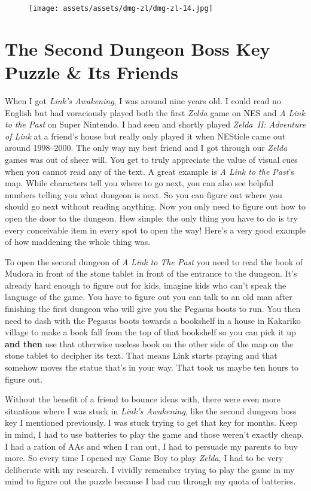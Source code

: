 \documentclass{book}
\begin{document}
\begin{figure}[hbt]
\vskip 10pt
\centering \texttt{[image: assets/assets/dmg-zl/dmg-zl-14.jpg]}
\vskip 6pt
\end{figure}

\FloatBarrier\needspace{10mm}\section*{The Second Dungeon Boss Key Puzzle \& Its Friends}\nopagebreak[4]

When I got \emph{Link’s Awakening}, I was around nine years old. I could read no English but had voraciously played both the first \emph{Zelda} game on NES and \emph{A Link to the Past} on Super Nintendo. I had seen and shortly played \emph{Zelda~II: Adventure of Link} at a friend’s house but really only played it when NESticle came out around 1998–2000. The only way my best friend and I got through our \emph{Zelda} games was out of sheer will. You get to truly appreciate the value of visual cues when you cannot read any of the text. A great example is \emph{A Link to the Past}’s map. While characters tell you where to go next, you can also see helpful numbers telling you what dungeon is next. So you can figure out where you should go next without reading anything. Now you only need to figure out how to open the door to the dungeon. How simple: the only thing you have to do is try every conceivable item in every spot to open the way! Here’s a very good example of how maddening the whole thing was.

To open the second dungeon of \emph{A Link to The Past} you need to read the book of Mudora in front of the stone tablet in front of the entrance to the dungeon. It’s already hard enough to figure out for kids, imagine kids who can’t speak the language of the game. You have to figure out you can talk to an old man after finishing the first dungeon who will give you the Pegasus boots to run. You then need to dash with the Pegasus boots towards a bookshelf in a house in Kakariko village to make a book fall from the top of that bookshelf so you can pick it up \textbf{and then} use that otherwise useless book on the other side of the map on the stone tablet to decipher its text. That means Link starts praying and that somehow moves the statue that’s in your way. That took us maybe ten hours to figure out.

Without the benefit of a friend to bounce ideas with, there were even more situations where I was stuck in \emph{Link’s Awakening}, like the second dungeon boss key I mentioned previously. I was stuck trying to get that key for months. Keep in mind, I had to use batteries to play the game and those weren’t exactly cheap. I had a ration of AAs and when I ran out, I had to persuade my parents to buy more. So every time I opened my Game Boy to play \emph{Zelda}, I had to be very deliberate with my research. I vividly remember trying to play the game in my mind to figure out the puzzle because I had run through my quota of batteries.
\end{document}
